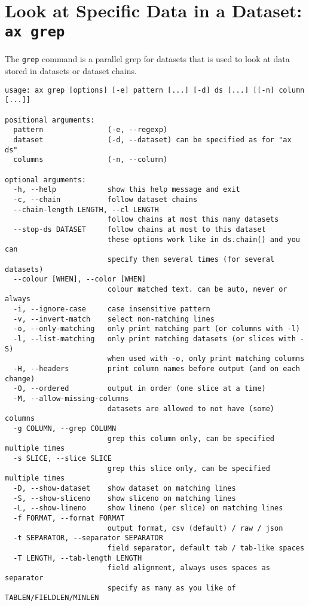 \section{Look at Specific Data in a Dataset: \texttt{ax grep}}
The \texttt{grep} command is a parallel grep for datasets that is
used to look at data stored in datasets or dataset chains.
\begin{snugshade}
\begin{verbatim}
usage: ax grep [options] [-e] pattern [...] [-d] ds [...] [[-n] column [...]]

positional arguments:
  pattern               (-e, --regexp)
  dataset               (-d, --dataset) can be specified as for "ax ds"
  columns               (-n, --column)

optional arguments:
  -h, --help            show this help message and exit
  -c, --chain           follow dataset chains
  --chain-length LENGTH, --cl LENGTH
                        follow chains at most this many datasets
  --stop-ds DATASET     follow chains at most to this dataset
                        these options work like in ds.chain() and you can
                        specify them several times (for several datasets)
  --colour [WHEN], --color [WHEN]
                        colour matched text. can be auto, never or always
  -i, --ignore-case     case insensitive pattern
  -v, --invert-match    select non-matching lines
  -o, --only-matching   only print matching part (or columns with -l)
  -l, --list-matching   only print matching datasets (or slices with -S)
                        when used with -o, only print matching columns
  -H, --headers         print column names before output (and on each change)
  -O, --ordered         output in order (one slice at a time)
  -M, --allow-missing-columns
                        datasets are allowed to not have (some) columns
  -g COLUMN, --grep COLUMN
                        grep this column only, can be specified multiple times
  -s SLICE, --slice SLICE
                        grep this slice only, can be specified multiple times
  -D, --show-dataset    show dataset on matching lines
  -S, --show-sliceno    show sliceno on matching lines
  -L, --show-lineno     show lineno (per slice) on matching lines
  -f FORMAT, --format FORMAT
                        output format, csv (default) / raw / json
  -t SEPARATOR, --separator SEPARATOR
                        field separator, default tab / tab-like spaces
  -T LENGTH, --tab-length LENGTH
                        field alignment, always uses spaces as separator
                        specify as many as you like of TABLEN/FIELDLEN/MINLEN

\end{verbatim}
\end{snugshade}
